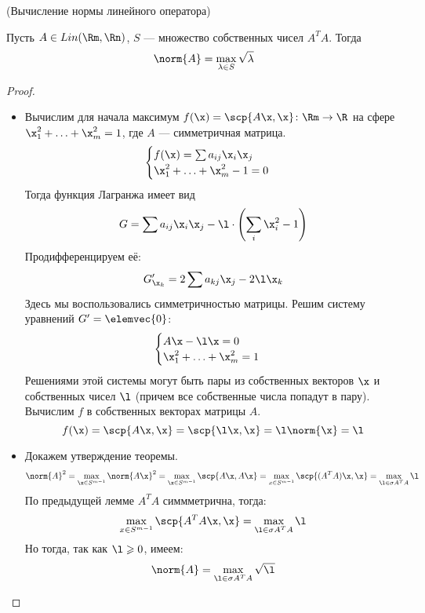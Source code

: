 \begin{theorem}(Вычисление нормы линейного оператора)

    Пусть $A \in Lin(\Rm, \Rn)$, $S$ --- множество собственных чисел $A^T A$.
    Тогда
\[
    \norm{A} = \max_{\lambda \in S}{\sqrt{\lambda}}
\]
\end{theorem}
\begin{proof}
    \enewline

    \begin{itemize}
    \item
    Вычислим для начала максимум $f(\x) = \scp{A\x, \x} \colon \Rm \to \R$ на сфере
    $\x_1^2 + \ldots + \x_m^2 = 1$, где $A$ --- симметричная матрица.
\[
    \begin{cases}
        f(\x) = \sum{a_{ij} \x_i \x_j} \\
        \x_1^2 + \ldots + \x_m^2 - 1 = 0
    \end{cases}
\]
    Тогда функция Лагранжа имеет вид
\[
    G = \sum{a_{ij} \x_i \x_j} - \l \cdot \left( \sum_{i}{\x_i^2} - 1 \right)
\]
    Продифференцируем её:
\[
    G'_{\x_k} = 2 \sum{a_{kj} \x_j} - 2 \l \x_k
\]
    Здесь мы воспользовались симметричностью матрицы. Решим систему уравнений
    $G' = \elemvec{0}$:
\[
    \begin{cases}
        A \x - \l \x = 0 \\
        \x_1^2 + \ldots + \x_m^2 = 1
    \end{cases}
\]
    Решениями этой системы могут быть пары из собственных векторов $\x$
    и собственных чисел $\l$ (причем все собственные числа попадут в пару).
    Вычислим $f$ в собственных векторах матрицы $A$.
\[
    f(\x) = \scp{A \x, \x} = \scp{\l \x, \x} = \l \norm{\x} = \l
\]
    \item Докажем утверждение теоремы.
\[
    \norm{A}^2 = \max_{\x \in S^{m - 1}}{\norm{A \x}^2}
    = \max_{\x \in S^{m - 1}}{\scp{A \x, A \x}} = \max_{x \in S^{m - 1}}
    {\scp{(A^T A) \x, \x}} = \max_{\l \in \sigma{A^T A}}{\l}
\]
    По предыдущей лемме $A^T A$ симмметрична, тогда:
\[
    \max_{x \in S^{m - 1}} {\scp{A^T A \x, \x}} = \max_{\l \in \sigma{A^T A}}{\l}
\]
    Но тогда, так как $\l \geqslant 0$, имеем:
\[
    \norm{A} = \max_{\l \in \sigma{A^T A}}{\sqrt{\l}}
\]
    \end{itemize}
\end{proof}
